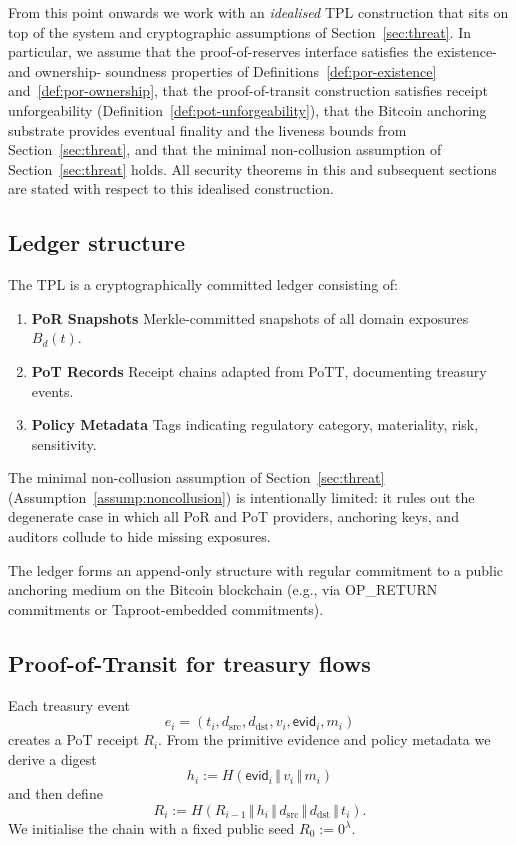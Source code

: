 \documentclass[11pt]{article}
\begin{document}
From this point onwards we work with an \emph{idealised} TPL construction that sits on top of the
system and cryptographic assumptions of Section~\ref{sec:threat}.
In particular, we assume that the proof-of-reserves interface satisfies the existence- and ownership-
soundness properties of Definitions~\ref{def:por-existence} and~\ref{def:por-ownership}, that the
proof-of-transit construction satisfies receipt unforgeability (Definition~\ref{def:pot-unforgeability}),
that the Bitcoin anchoring substrate provides eventual finality and the liveness bounds from
Section~\ref{sec:threat}, and that the minimal non-collusion assumption of Section~\ref{sec:threat} holds.
All security theorems in this and subsequent sections are stated with respect to this idealised construction.

\subsection{Ledger structure}

The TPL is a cryptographically committed ledger consisting of:

\begin{enumerate}[noitemsep]
\item \textbf{PoR Snapshots}  
Merkle-committed snapshots of all domain exposures $B_d(t)$.
\item \textbf{PoT Records}  
Receipt chains adapted from PoTT, documenting treasury events.
\item \textbf{Policy Metadata}  
Tags indicating regulatory category, materiality, risk, sensitivity.
\end{enumerate}
The minimal non-collusion assumption of Section~\ref{sec:threat} (Assumption~\ref{assump:noncollusion}) is intentionally limited: it rules out the degenerate case in which all PoR and PoT providers, anchoring keys, and auditors collude to hide missing exposures.

The ledger forms an append-only structure with regular commitment to a public anchoring medium on the Bitcoin blockchain (e.g., via OP\_RETURN commitments or Taproot-embedded commitments).

\subsection{Proof-of-Transit for treasury flows}

Each treasury event
\[
e_i = (t_i, d_{\mathrm{src}}, d_{\mathrm{dst}}, v_i, \mathsf{evid}_i, m_i)
\]
creates a PoT receipt $R_i$.
From the primitive evidence and policy metadata we derive a digest
\[
h_i := H(\mathsf{evid}_i \,\Vert\, v_i \,\Vert\, m_i)
\]
and then define
\[
R_i := H(R_{i-1} \,\Vert\, h_i \,\Vert\, d_{\mathrm{src}} \,\Vert\, d_{\mathrm{dst}} \,\Vert\, t_i).
\]
We initialise the chain with a fixed public seed $R_0 := 0^\lambda$.
\end{document}
